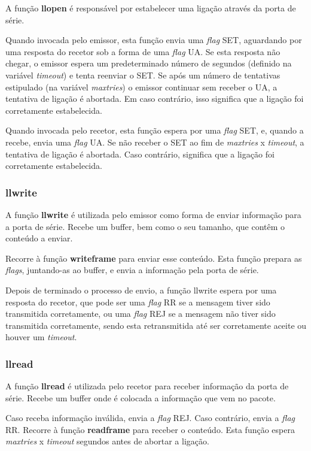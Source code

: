 \documentclass[11pt,a4paper,reqno]{article}
\numberwithin{equation}{section}
\begin{document}
A função \textbf{llopen} é responsável por estabelecer uma ligação através da porta de série.

Quando invocada pelo emissor, esta função envia uma \textit{flag} SET, aguardando por uma resposta do recetor sob a forma de uma \textit{flag} UA. Se esta resposta não chegar, o emissor espera um predeterminado número de segundos (definido na variável \textit{timeout}) e tenta reenviar o SET. Se após um número de tentativas estipulado (na variável \textit{max\textunderscore tries}) o emissor continuar sem receber o UA, a tentativa de ligação é abortada. Em caso contrário, isso significa que a ligação foi corretamente estabelecida.

Quando invocada pelo recetor, esta função espera por uma \textit{flag} SET, e, quando a recebe, envia uma \textit{flag} UA. Se não receber o SET ao fim de \textit{max\textunderscore tries} x \textit{timeout}, a tentativa de ligação é abortada. Caso contrário, significa que a ligação foi corretamente estabelecida.

\subsubsection{llwrite}

A função \textbf{llwrite} é utilizada pelo emissor como forma de enviar informação para a porta de série. Recebe um buffer, bem como o seu tamanho, que contêm o conteúdo a enviar.

Recorre à função \textbf{write\textunderscore frame} para enviar esse conteúdo. Esta função prepara as \textit{flags}, juntando-as ao buffer, e envia a informação pela porta de série.

Depois de terminado o processo de envio, a função llwrite espera por uma resposta do recetor, que pode ser uma \textit{flag} RR se a mensagem tiver sido transmitida corretamente, ou uma \textit{flag} REJ se a mensagem não tiver sido transmitida corretamente, sendo esta retransmitida até ser corretamente aceite ou houver um \textit{timeout}.

\subsubsection{llread}

A função \textbf{llread} é utilizada pelo recetor para receber informação da porta de série. Recebe um buffer onde é colocada a informação que vem no pacote.

Caso receba informação inválida, envia a \textit{flag} REJ. Caso contrário, envia a \textit{flag} RR. Recorre à função \textbf{read\textunderscore frame} para receber o conteúdo. Esta função espera \textit{max\textunderscore tries} x \textit{timeout} segundos antes de abortar a ligação.
\end{document}
